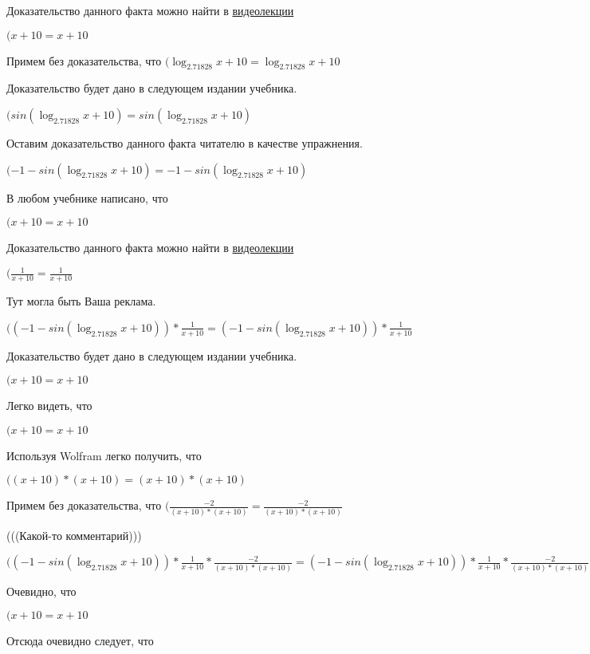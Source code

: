 \documentclass[12pt,a4paper,fleqn]{article}
\theoremstyle{definition}
\begin{document}
Доказательство данного факта можно найти в \href{https://www.youtube.com/watch?v=dQw4w9WgXcQ}{видеолекции}

$( x  +  10  =  x  +  10 $

Примем без доказательства, что
$(\log_{ 2.71828 }{ x  +  10 } = \log_{ 2.71828 }{ x  +  10 }$

Доказательство будет дано в следующем издании учебника.

$(sin(\log_{ 2.71828 }{ x  +  10 }) = sin(\log_{ 2.71828 }{ x  +  10 })$

Оставим доказательство данного факта читателю в качестве упражнения.

$( -1  - sin(\log_{ 2.71828 }{ x  +  10 }) =  -1  - sin(\log_{ 2.71828 }{ x  +  10 })$

В любом учебнике написано, что

$( x  +  10  =  x  +  10 $

Доказательство данного факта можно найти в \href{https://www.youtube.com/watch?v=dQw4w9WgXcQ}{видеолекции}

$(\frac{ 1 }{ x  +  10 }
 = \frac{ 1 }{ x  +  10 }
$

Тут могла быть Ваша реклама.

$(( -1  - sin(\log_{ 2.71828 }{ x  +  10 })) * \frac{ 1 }{ x  +  10 }
 = ( -1  - sin(\log_{ 2.71828 }{ x  +  10 })) * \frac{ 1 }{ x  +  10 }
$

Доказательство будет дано в следующем издании учебника.

$( x  +  10  =  x  +  10 $

Легко видеть, что

$( x  +  10  =  x  +  10 $

Используя Wolfram легко получить, что

$(( x  +  10 ) * ( x  +  10 ) = ( x  +  10 ) * ( x  +  10 )$

Примем без доказательства, что
$(\frac{ -2 }{( x  +  10 ) * ( x  +  10 )}
 = \frac{ -2 }{( x  +  10 ) * ( x  +  10 )}
$

(((Какой-то комментарий)))

$(( -1  - sin(\log_{ 2.71828 }{ x  +  10 })) * \frac{ 1 }{ x  +  10 }
 * \frac{ -2 }{( x  +  10 ) * ( x  +  10 )}
 = ( -1  - sin(\log_{ 2.71828 }{ x  +  10 })) * \frac{ 1 }{ x  +  10 }
 * \frac{ -2 }{( x  +  10 ) * ( x  +  10 )}
$

Очевидно, что

$( x  +  10  =  x  +  10 $

Отсюда очевидно следует, что
\end{document}
